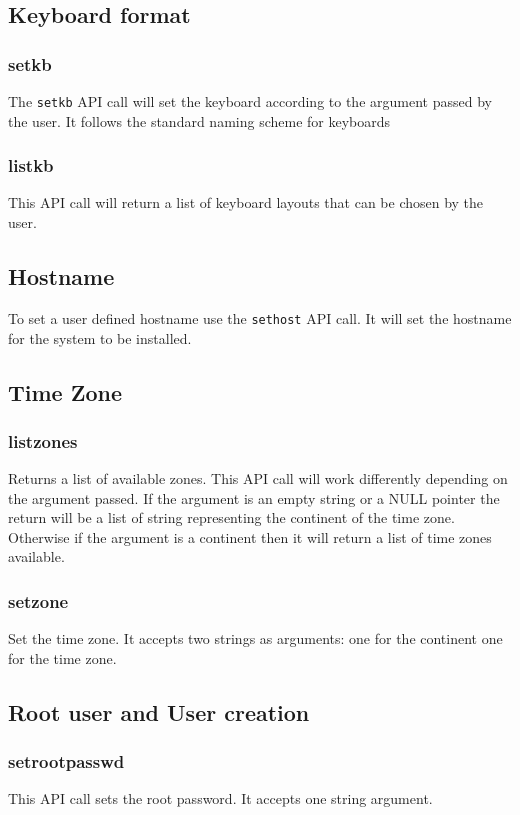 \documentclass{scrartcl}
\begin{document}
\subsection{Keyboard format}
\subsubsection{setkb}
The \texttt{setkb} API call will set the keyboard according to the argument
passed by the user. It follows the standard naming scheme for keyboards
\subsubsection{listkb}
This API call will return a list of keyboard layouts that can be chosen by the
user.

\subsection{Hostname}
To set a user defined hostname use the \texttt{sethost} API call. It will set
the hostname for the system to be installed.

\subsection{Time Zone}
\subsubsection{listzones}
Returns a list of available zones. This API call will work differently depending
on the argument passed. If the argument is an empty string or a NULL pointer
the return will be a list of string representing the continent of the time zone.
Otherwise if the argument is a continent then it will return a list of time
zones available.
\subsubsection{setzone}
Set the time zone. It accepts two strings as arguments: one for the continent
one for the time zone.

\subsection{Root user and User creation}
\subsubsection{setrootpasswd}
This API call sets the root password. It accepts one string argument.
\end{document}
